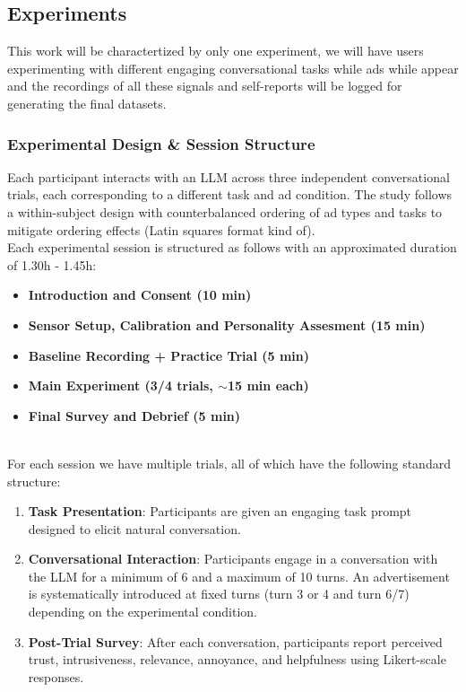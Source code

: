 \documentclass{article}
\begin{document}
\newpage   

\subsection{Experiments}

This work will be charactertized by only one experiment, we will have users experimenting with different engaging conversational tasks while ads while appear and the recordings of all these signals and self-reports will be logged for generating the final datasets.

\subsubsection{Experimental Design \& Session Structure}

Each participant interacts with an LLM across three independent conversational trials, each corresponding to a different task and ad condition. The study follows a within-subject design with counterbalanced ordering of ad types and tasks to mitigate ordering effects (Latin squares format kind of).
\\ 

Each experimental session is structured as follows with an approximated duration of 1.30h - 1.45h:

\begin{itemize}
    \item \textbf{Introduction and Consent (10 min)}
    \item \textbf{Sensor Setup, Calibration and Personality Assesment (15 min)}
    \item \textbf{Baseline Recording + Practice Trial (5 min)}
    \item \textbf{Main Experiment (3/4 trials, $\sim$15 min each)}
    \item \textbf{Final Survey and Debrief (5 min)}
\end{itemize}
\\ 

For each session we have multiple trials, all of which have the following standard structure:
\\ 

\begin{enumerate}
    \item \textbf{Task Presentation}: Participants are given an engaging task prompt designed to elicit natural conversation.

    \item \textbf{Conversational Interaction}: Participants engage in a conversation with the LLM for a minimum of 6 and a maximum of 10 turns. An advertisement is systematically introduced at fixed turns (turn 3 or 4 and turn 6/7) depending on the experimental condition.

    \item \textbf{Post-Trial Survey}: After each conversation, participants report perceived trust, intrusiveness, relevance, annoyance, and helpfulness using Likert-scale responses.
\end{enumerate}
\end{document}

